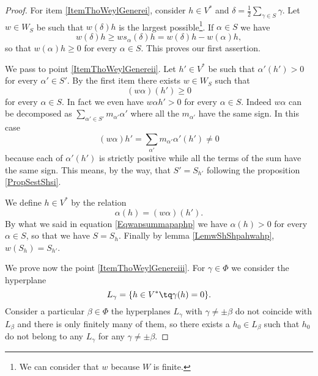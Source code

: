 \begin{proof}
    For item \ref{ItemThoWeylGenerei}, consider \( h\in V^*\) and \( \delta=\frac{ 1 }{2}\sum_{\gamma\in S}\gamma\). Let \( w\in W_S\) be such that \( w(\delta)h\) is the largest possible\footnote{We can consider that \( w\) because \( W\) is finite.}. If \( \alpha\in S\) we have
    \begin{equation}
        w(\delta)h\geq ws_{\alpha}(\delta)h=w(\delta)h-w(\alpha)h,
    \end{equation}
    so that \( w(\alpha)h\geq 0\) for every \( \alpha\in S\). This proves our first assertion.

    We pass to point \ref{ItemThoWeylGenereii}. Let \( h'\in V^*\) be such that \( \alpha'(h')> 0\) for every \( \alpha'\in S'\). By the first item there exists \( w\in W_S\) such that
    \begin{equation}
        (w\alpha)(h')\geq 0
    \end{equation}
    for every \( \alpha\in S\). In fact we even have \( w\alpha h'>0\) for every \( \alpha\in S\). Indeed \( w\alpha\) can be decomposed as \( \sum_{\alpha'\in S'}m_{\alpha'}\alpha'\) where all the \( m_{\alpha'}\) have the same sign. In this case
    \begin{equation}        \label{Eqwapsummapaphp}
        (w\alpha)h'=\sum_{\alpha'}m_{\alpha'}\alpha'(h')\neq 0
    \end{equation}
    because each of \( \alpha'(h')\) is strictly positive while all the terms of the sum have the same sign. This means, by the way, that \( S'=S_{h'}\) following the proposition \ref{PropSestShsi}.
    
    We define \( h\in V^*\) by the relation
    \begin{equation}
        \alpha(h)=(w\alpha)(h').
    \end{equation}
    By what we said in equation \eqref{Eqwapsummapaphp} we have \( \alpha(h)>0\) for every \( \alpha\in S\), so that we have \( S=S_h\). Finally by lemma \ref{LemwShShpahwahp}, \( w(S_h)=S_{h'}\).

    We prove now the point \ref{ItemThoWeylGenereiii}. For \( \gamma\in\Phi\) we consider the hyperplane
    \begin{equation}
        L_{\gamma}=\{ h\in V^*\tq \gamma(h)=0 \}.
    \end{equation}
    Consider a particular \( \beta\in\Phi\) the hyperplanes \( L_{\gamma}\) with \( \gamma\neq\pm\beta\) do not coincide with \( L_{\beta}\) and there is only finitely many of them, so there exists a \( h_0\in L_{\beta}\) such that \( h_0\) do not belong to any \( L_{\gamma}\) for any \( \gamma\neq \pm\beta\).


\end{proof}

